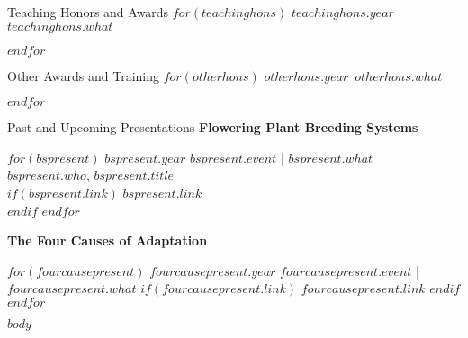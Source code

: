 \documentclass[$if(fontsize)$$fontsize$,$endif$$if(lang)$$babel-lang$,$endif$$if(papersize)$$papersize$paper,$endif$$for(classoption)$$classoption$$sep$,$endfor$]{$documentclass$}
\begin{document}

\begin{rSection}{Teaching Honors and Awards}
$for(teachinghons)$
\textbf{$teachinghons.year$}\ $teachinghons.what$

$endfor$
\end{rSection}



\begin{rSection}{Other Awards and Training}
$for(otherhons)$
\textbf{$otherhons.year$}\ $otherhons.what$

$endfor$
\end{rSection}



\begin{rSection}{Past and Upcoming Presentations}
\textbf{Flowering Plant Breeding Systems}

$for(bspresent)$
\textbf{$bspresent.year$} $bspresent.event$ | $bspresent.what$\\
$bspresent.who$, $bspresent.title$\\

$if(bspresent.link)$
$bspresent.link$\\
$endif$
$endfor$

\textbf{The Four Causes of Adaptation}

$for(fourcausepresent)$
\textbf{$fourcausepresent.year$} $fourcausepresent.event$ | $fourcausepresent.what$ 
$if(fourcausepresent.link)$
$fourcausepresent.link$
$endif$
\linebreak
$endfor$

\end{rSection}


$body$

\end{document}
